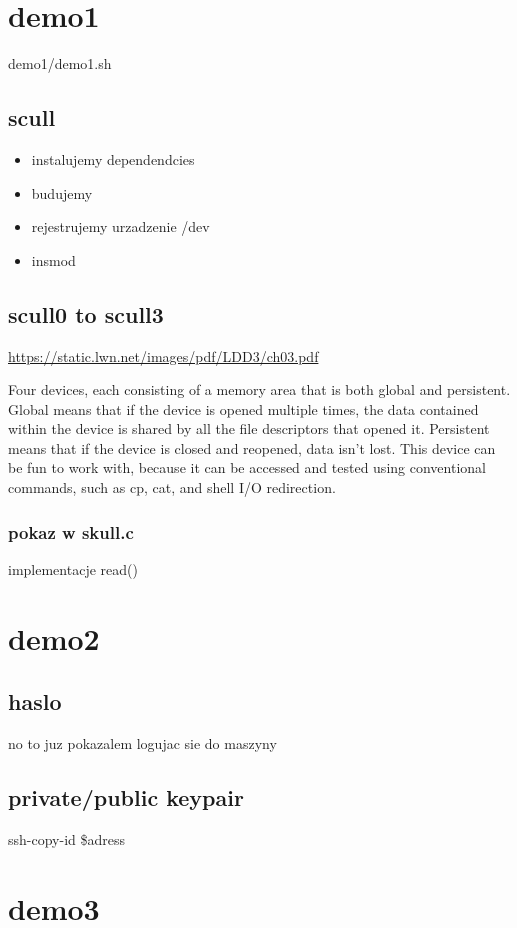 \documentclass[11pt]{article}
\author{Patryk Kaniewski}
\date{\today}
\title{}
\begin{document}
\tableofcontents \clearpage\section{demo1}
\label{sec:org2e65028}
demo1/demo1.sh
\subsection{scull}
\label{sec:org84bddf1}
\begin{itemize}
\item instalujemy dependendcies
\item budujemy
\item rejestrujemy urzadzenie /dev
\item insmod
\end{itemize}
\subsection{scull0 to scull3}
\label{sec:orgcb52b95}
\url{https://static.lwn.net/images/pdf/LDD3/ch03.pdf}

Four devices, each consisting of a memory area that is both global and persistent. Global means that if the device is opened multiple times, the data contained within the device is shared by all the file descriptors that opened it.
Persistent means that if the device is closed and reopened, data isn’t lost. This
device can be fun to work with, because it can be accessed and tested using conventional commands, such as cp, cat, and shell I/O redirection.

\subsubsection{pokaz w skull.c}
\label{sec:org34f20eb}
implementacje read()

\section{demo2}
\label{sec:org1da6919}
\subsection{haslo}
\label{sec:org30da1da}
no to juz pokazalem logujac sie do maszyny
\subsection{private/public keypair}
\label{sec:orga80c7be}
ssh-copy-id \$adress
\section{demo3}
\label{sec:org31e6c6b}
\end{document}
